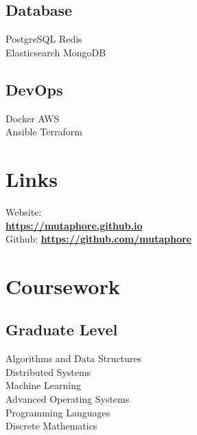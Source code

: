 \documentclass[letterpaper]{deedy-resume} %
\begin{document}
\begin{minipage}[t]{0.33\textwidth}
\subsection{Database}
PostgreSQL \textbullet{}
Redis \\
Elasticsearch \textbullet{}
MongoDB

\sectionspace
\subsection{DevOps}
Docker \textbullet{}
AWS \\
Ansible \textbullet{}
Terraform

\sectionspace %


\section{Links} 

Website: \\ \href{https://mutaphore.github.io}{\bf https://mutaphore.github.io} \\
Github: \href{https://github.com/mutaphore}{\bf https://github.com/mutaphore} \\

\sectionspace %


\section{Coursework}

\subsection{Graduate Level}

Algorithms and Data Structures \\
Distributed Systems \\
Machine Learning \\
Advanced Operating Systems \\
Programming Languages \\
Discrete Mathematics

\sectionspace %


\end{minipage}
\end{document}

